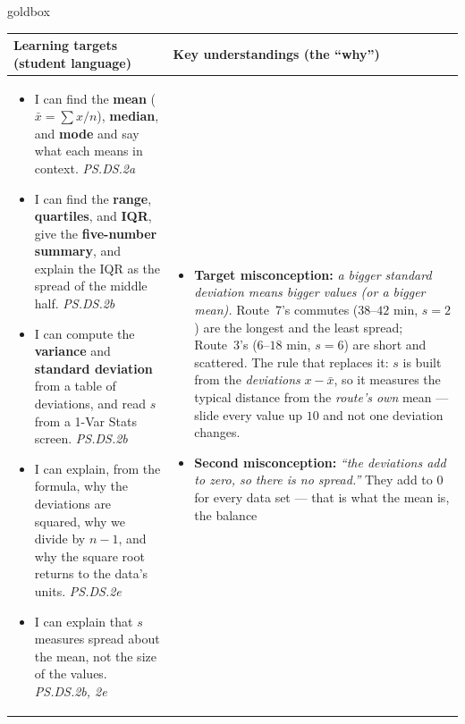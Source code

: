 \documentclass[10pt]{article}
\begin{document}
\renewcommand{\arraystretch}{1.4}
\boxguard
\begin{skillbox}{goldbox}
\begin{tabularx}{\linewidth}{@{}X|X@{}}
\textbf{Learning targets (student language)} & \textbf{Key understandings (the ``why'')} \\[2pt]
\hline
\vspace{-6pt}
\begin{itemize}[leftmargin=1.1em, nosep, after=\vspace{2pt}]
  \item I can find the \textbf{mean} ($\bar{x} = \sum x / n$), \textbf{median}, and
        \textbf{mode} and say what each means in context. \hfill \textit{PS.DS.2a}
  \item I can find the \textbf{range}, \textbf{quartiles}, and \textbf{IQR}, give the
        \textbf{five-number summary}, and explain the IQR as the spread of the middle half.
        \hfill \textit{PS.DS.2b}
  \item I can compute the \textbf{variance} and \textbf{standard deviation} from a table of
        deviations, and read $s$ from a 1-Var Stats screen. \hfill \textit{PS.DS.2b}
  \item I can explain, from the formula, why the deviations are squared, why we divide by
        $n - 1$, and why the square root returns to the data's units. \hfill \textit{PS.DS.2e}
  \item I can explain that $s$ measures spread about the mean, not the size of the values.
        \hfill \textit{PS.DS.2b, 2e}
\end{itemize}
&
\vspace{-6pt}
\begin{itemize}[leftmargin=1.1em, nosep, after=\vspace{2pt}]
  \item \textbf{Target misconception:} \emph{a bigger standard deviation means bigger values
        (or a bigger mean).} Route~7's commutes ($38$--$42$ min, $s = 2$) are the longest and
        the least spread; Route~3's ($6$--$18$ min, $s = 6$) are short and scattered. The rule
        that replaces it: $s$ is built from the \emph{deviations} $x - \bar{x}$, so it measures
        the typical distance from the \emph{route's own} mean --- slide every value up $10$ and
        not one deviation changes.
  \item \textbf{Second misconception:} \emph{``the deviations add to zero, so there is no
        spread.''} They add to $0$ for every data set --- that is what the mean is, the balance

\end{itemize}
\end{tabularx}
\end{skillbox}
\end{document}
